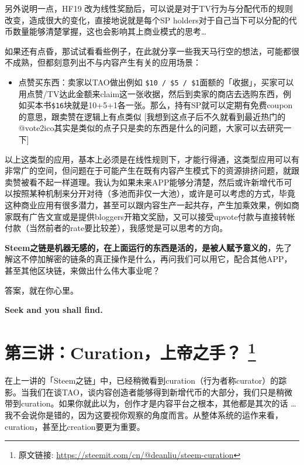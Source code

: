\documentclass[]{ctexbook}
\providecommand{\tightlist}{%
  \setlength{\itemsep}{0pt}\setlength{\parskip}{0pt}}
\begin{document}
另外说明一点，HF19 改为线性奖励后，可以说是对于TV行为与分配代币的规则改变，造成很大的变化，直接地说就是每个SP holders对于自己当下可以分配的代币数量能够清楚掌握，这也会影响其上商业模式的思考\ldots{}

如果还有点昏，那试试看看些例子，在此就分享一些我天马行空的想法，可能都很不成熟，但都刻意列出不与内容产生有关的应用场景：

\begin{itemize}
\tightlist
\item
  点赞买东西：卖家以TAO做出例如 \texttt{\$10\ /\ \$5\ /\ \$1}面额的「收据」，买家可以用点赞/TV达此金额来claim这一张收据，然后到卖家的商店去选购东西，例如买本书\texttt{\$16}块就是10+5+1各一张。那么，持有SP就可以定期有免费coupon的意思，跟卖赞在逻辑上有点类似 {[}我想到这点子后不久就看到最近热门的 @vote2ico其实是类似的点子只是卖的东西是什么的问题，大家可以去研究一下{]}
\end{itemize}

以上这类型的应用，基本上必须是在线性规则下，才能行得通，这类型应用可以有非常广的空间，但问题在于可能产生在既有内容产生模式下的资源排挤问题，就跟卖赞被看不起一样道理。我认为如果未来APP能够分清楚，然后或许新增代币可以按照某种机制来分开对待（多池而非仅一大池），或许是可以考虑的方式，毕竟这种商业应用有很多潜力，甚至可以跟内容生产一起共存，产生加乘效果，例如商家既有广告文宣或是提供bloggers开箱文奖励，又可以接受upvote付款与直接转帐付款（当然前者的rate要比较差），我感觉是可以思考的方向。

\textbf{Steem之链是机器无感的，在上面运行的东西是活的，是被人赋予意义的}，先了解这不停加解密的链条的真正操作是什么，再问我们可以用它，配合其他APP，甚至其他区块链，来做出什么伟大事业呢？

答案，就在你心里。

\textbf{Seek and you shall find.}

\hypertarget{deanliu3}{%
\section[第三讲：Curation，上帝之手？ ]{\texorpdfstring{第三讲：Curation，上帝之手？ \footnote{原文链接: \url{https://steemit.com/cn/@deanliu/steem-curation}}}{第三讲：Curation，上帝之手？ }}\label{deanliu3}}

在上一讲的「Steem之链」中，已经稍微看到curation（行为者称curator）的踪影。当我们在谈TAO，谈内容创造者能够得到新增代币的大部分，我们只是稍微带到curation。如果你就此以为，创作才是内容平台之根本，其他都是其次的话 \ldots{} 我不会说你是错的，因为这要视你观察的角度而言。从整体系统的运作来看，curation，甚至比creation要更为重要。
\end{document}
